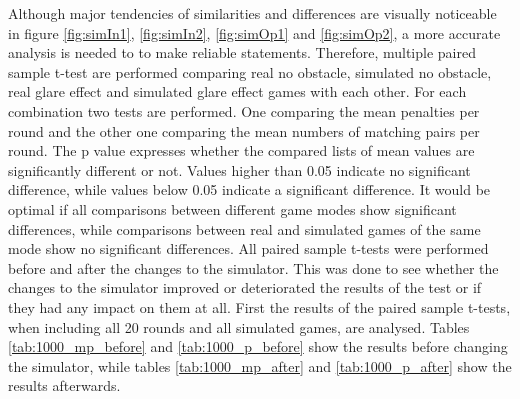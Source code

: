 Although major tendencies of similarities and differences are visually noticeable in figure \ref{fig:simIn1}, \ref{fig:simIn2}, \ref{fig:simOp1} and \ref{fig:simOp2}, a more accurate analysis is needed to to make reliable statements. Therefore, multiple paired sample t-test are performed comparing real no obstacle, simulated no obstacle, real glare effect and simulated glare effect games with each other. For each combination two tests are performed. One comparing the mean penalties per round and the other one comparing the mean numbers of matching pairs per round. The p value expresses whether the compared lists of mean values are significantly different or not. Values higher than 0.05 indicate no significant difference, while values below 0.05 indicate a significant difference. It would be optimal if all comparisons between different game modes show significant differences, while comparisons between real and simulated games of the same mode show no significant differences. All paired sample t-tests were performed before and after the changes to the simulator. This was done to see whether the changes to the simulator improved or deteriorated the results of the test or if they had any impact on them at all. First the results of the paired sample t-tests, when including all 20 rounds and all simulated games, are analysed. Tables \ref{tab:1000_mp_before} and \ref{tab:1000_p_before} show the results before changing the simulator, while tables \ref{tab:1000_mp_after} and \ref{tab:1000_p_after} show the results afterwards.

\newpage

